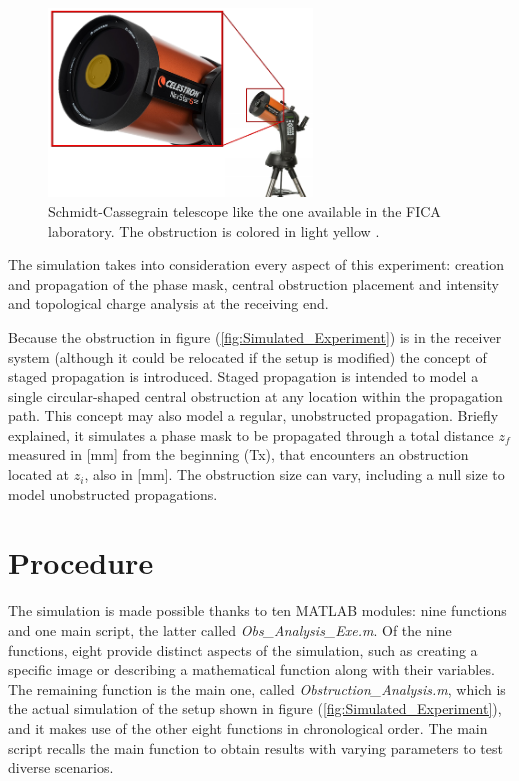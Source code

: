 \begin{figure}[htbp]
    \centering
    \includegraphics[width=7cm]{images/c03/Cassegrain-Obstruction.png}
    \caption{Schmidt-Cassegrain telescope like the one available in the FICA laboratory. The obstruction is colored in light yellow \protect\cite{Schmidt-Cassegrain_Pics}.}
    \label{fig:Schmidt-Cassegrain-Obstruction}
\end{figure}

The simulation takes into consideration every aspect of this experiment: creation and propagation of the phase mask, central obstruction placement and intensity and topological charge analysis at the receiving end.

Because the obstruction in figure (\ref{fig:Simulated_Experiment}) is in the receiver system (although it could be relocated if the setup is modified) the concept of staged propagation is introduced. Staged propagation is intended to model a single circular-shaped central obstruction at any location within the propagation path. This concept may also model a regular, unobstructed propagation. Briefly explained, it simulates a phase mask to be propagated through a total distance $z_f$ measured in [mm] from the beginning (Tx), that encounters an obstruction located at $z_i$, also in [mm]. The obstruction size can vary, including a null size to model unobstructed propagations.

\section{Procedure}
\label{c3:Procedure}

The simulation is made possible thanks to ten MATLAB modules: nine functions and one main script, the latter called \textit{Obs\_Analysis\_Exe.m}. Of the nine functions, eight provide distinct aspects of the simulation, such as creating a specific image or describing a mathematical function along with their variables. The remaining function is the main one, called \textit{Obstruction\_Analysis.m}, which is the actual simulation of the setup shown in figure (\ref{fig:Simulated_Experiment}), and it makes use of the other eight functions in chronological order. The main script recalls the main function to obtain results with varying parameters to test diverse scenarios.

